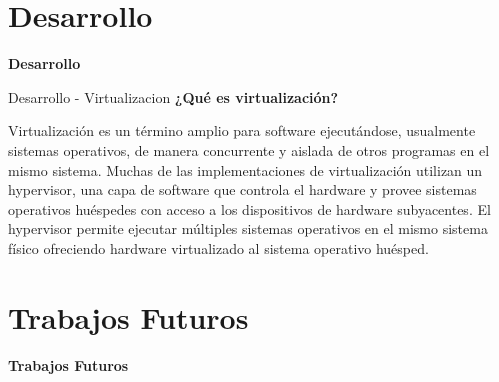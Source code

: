 \documentclass{beamer}
\begin{document}
\section{Desarrollo}
\begin{frame}
    \Huge
    \centering
    \textbf{ Desarrollo }

\end{frame}

\begin{frame}{Desarrollo - Virtualizacion}
\vspace{-1.5cm}
\textbf{ ¿Qué es virtualización? }

Virtualización es un término amplio para software ejecutándose, usualmente sistemas operativos, de manera concurrente y aislada de otros programas en el mismo sistema. Muchas de las implementaciones de virtualización utilizan un hypervisor, una capa de software que controla el hardware y provee sistemas operativos huéspedes con acceso a los dispositivos de hardware subyacentes. El hypervisor permite ejecutar múltiples sistemas operativos en el mismo sistema físico ofreciendo hardware virtualizado al sistema operativo huésped.



\end{frame}


\section{Trabajos Futuros}
\begin{frame}
    \Huge
    \centering
    \textbf{Trabajos Futuros}

\end{frame}
\end{document}
